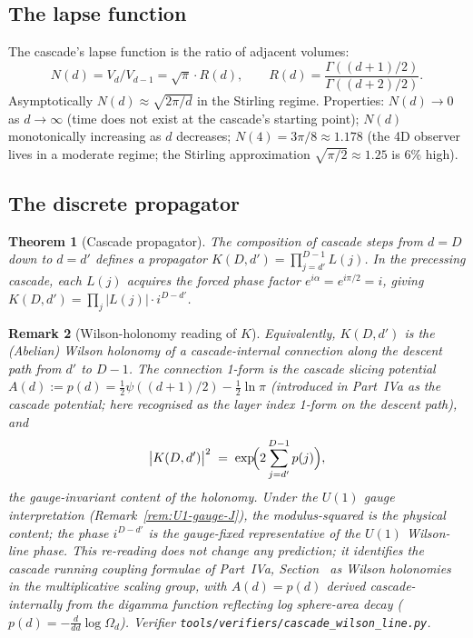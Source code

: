 \documentclass[12pt,a4paper]{article}
\newtheorem{theorem}{Theorem}[section]
\newtheorem{remark}[theorem]{Remark}
\begin{document}
\subsection{The lapse function}

The cascade's lapse function is the ratio of adjacent volumes:
\[
N(d) = V_d/V_{d-1} = \sqrt{\pi}\cdot R(d),\qquad R(d) = \frac{\Gamma((d+1)/2)}{\Gamma((d+2)/2)}.
\]
Asymptotically $N(d)\approx\sqrt{2\pi/d}$ in
the Stirling regime. Properties: $N(d)\to 0$ as $d\to\infty$ (time does not exist at the
cascade's starting point); $N(d)$ monotonically increasing as $d$ decreases; $N(4)=3\pi/8
\approx 1.178$ (the 4D observer lives in a moderate regime; the Stirling approximation
$\sqrt{\pi/2}\approx 1.25$ is 6\% high).

\subsection{The discrete propagator}

\begin{theorem}[Cascade propagator]\label{thm:propagator}
The composition of cascade steps from $d=D$ down to $d=d'$ defines a propagator
$K(D,d')=\prod_{j=d'}^{D-1}L(j)$. In the precessing cascade, each $L(j)$ acquires the
forced phase factor $e^{i\alpha}=e^{i\pi/2}=i$, giving
$K(D,d')=\prod_j|L(j)|\cdot i^{D-d'}$.
\end{theorem}

\begin{remark}[Wilson-holonomy reading of $K$]\label{rem:wilson-K}
Equivalently, $K(D, d')$ is the (Abelian) Wilson holonomy of a
cascade-internal connection along the descent path from $d'$ to
$D-1$. The connection 1-form is the cascade slicing potential
$A(d) := p(d) = \tfrac{1}{2}\psi((d+1)/2) - \tfrac{1}{2}\ln\pi$
(introduced in Part~IVa as the cascade potential; here recognised
as the layer index 1-form on the descent path), and
\[
\bigl|K(D, d')\bigr|^2 \;=\; \exp\!\Bigl(2\sum_{j=d'}^{D-1} p(j)\Bigr),
\]
the gauge-invariant content of the holonomy. Under the $U(1)$
gauge interpretation
(Remark~\ref{rem:U1-gauge-J}), the modulus-squared is the physical
content; the phase $i^{D-d'}$ is the gauge-fixed representative of
the $U(1)$ Wilson-line phase. This re-reading does not change any
prediction; it identifies the cascade running coupling formulae of
Part~IVa, Section~ as Wilson holonomies in the multiplicative
scaling group, with $A(d) = p(d)$ derived cascade-internally from
the digamma function reflecting log sphere-area decay
($p(d) = -\tfrac{d}{dd}\log\Omega_d$). Verifier
\texttt{tools/verifiers/cascade\_wilson\_line.py}.
\end{remark}
\end{document}
